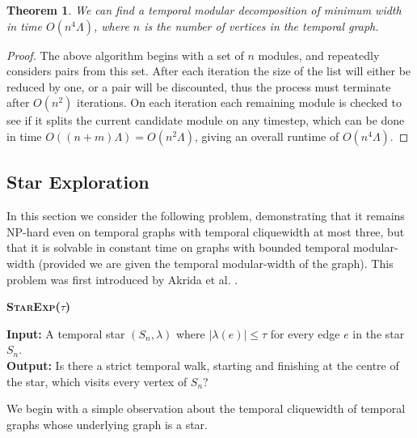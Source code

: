 \documentclass[preprint,12pt]{elsarticle}
\makeatletter
\newtheorem{theorem}{Theorem}
\newcommand{\decisionproblem}[3]{%
\begin{framed}
\vspace{0,1cm} \noindent
 \textbf{\textsc{#1} }
\par%
\noindent
{\bf{Input:}}  #2\\%
{\bf{Output:}} #3%
\end{framed}
}
\makeatother
\begin{document}
\begin{theorem}
    We can find a temporal modular decomposition of minimum width in time $O(n^4\Lambda)$, where $n$ is the number of vertices in the temporal graph.
\end{theorem}
\begin{proof}
    The above algorithm begins with a set of $n$ modules, and repeatedly considers pairs from this set. After each iteration the size of the list will either be reduced by one, or a pair will be discounted, thus the process must terminate after $O(n^2)$ iterations. On each iteration each remaining module is checked to see if it splits the current candidate module on any timestep, which can be done in time $O((n+m)\Lambda) = O(n^2\Lambda)$, giving an overall runtime of $O(n^4\Lambda)$.
\end{proof}

\subsection{Star Exploration}\label{sec:starexp}

In this section we consider the following problem, demonstrating that it remains NP-hard even on temporal graphs with temporal cliquewidth at most three, but that it is solvable in constant time on graphs with bounded temporal modular-width (provided we are given the temporal modular-width of the graph). This problem was first introduced by Akrida et al. \cite{akrida_temporal_2021}.

\decisionproblem{StarExp($\tau$)}{A temporal star $(S_n, \lambda)$ where $| \lambda(e) | \leq \tau$ for every edge $e$ in the star $S_n$.}{Is there a strict temporal walk, starting and finishing at the centre of the star, which visits every vertex of $S_n$?}

We begin with a simple observation about the temporal cliquewidth of temporal graphs whose underlying graph is a star.
\end{document}
